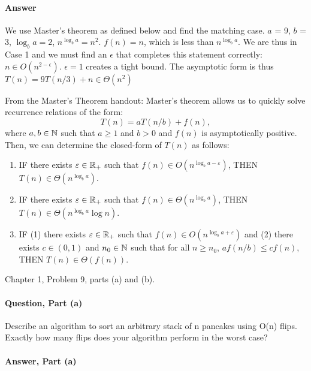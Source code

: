 \documentclass{article}
\begin{document}
\begin{enumerate}
        \paragraph{Answer}{We use Master's theorem as defined below and find the matching case. $a$ = 9, $b$ = 3, ${\log_b a} = 2$, $n^{\log_b a} = n^2$. $f(n) = n$, which is less than $n^{\log_b a}$. We are thus in Case 1 and we must find an $\epsilon$ that completes this statement correctly: $n \in O(n^{2-\epsilon})$. $\epsilon = 1$ creates a tight bound. The asymptotic form is thus $T(n) = 9 T(n/3) + n \in \Theta(n^2)$}
\end{enumerate}

From the Master's Theorem handout: 
Master's theorem allows us to quickly solve recurrence relations of the form:
$$ T(n) = a T(n/b) + f(n),$$
where $a, b \in {\mathbb N}$ such that $a \geq 1$ and $b >0$ and $f(n)$ is asymptotically
positive.  Then, we can determine the closed-form of $T(n)$ as follows:
\begin{enumerate}
    \item IF there exists $\varepsilon \in {\mathbb R}_+$ such that $f(n) \in O(n^{\log_b
        a - \varepsilon})$, THEN $T(n) \in \Theta(n^{\log_b a})$.
    \item IF there exists $\varepsilon \in {\mathbb R}_+$ such that $f(n) \in \Theta(n^{\log_b
        a})$, THEN $T(n) \in \Theta(n^{\log_b a}\log n)$.
    \item IF (1) there exists $\varepsilon \in {\mathbb R}_+$ such that $f(n) \in O(n^{\log_b
        a + \varepsilon})$
        and (2) there exists $c \in (0,1)$ and $n_0 \in {\mathbb N}$ such that for all $n
        \geq n_0$, $a f(n/b) \leq c f(n)$, THEN $T(n) \in \Theta(f(n))$.
\end{enumerate}


\collab{\todo{}}

Chapter 1, Problem 9, parts (a) and (b).

\paragraph{Question, Part (a)}{Describe an algorithm to sort an arbitrary stack of n pancakes using O(n) flips. Exactly how many flips does your algorithm perform in the worst case?}
\paragraph{Answer, Part (a)}
\end{document}
